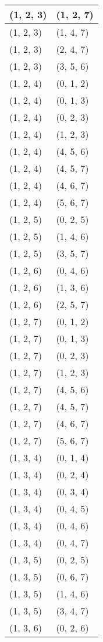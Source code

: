 \begin{footnotesize}
\begin{longtable}[c]{|l|l|}
(1, 2, 3)
&(1, 2, 7)
\\ \hline
(1, 2, 3)
&(1, 4, 7)
\\ \hline
(1, 2, 3)
&(2, 4, 7)
\\ \hline
(1, 2, 3)
&(3, 5, 6)
\\ \hline
(1, 2, 4)
&(0, 1, 2)
\\ \hline
(1, 2, 4)
&(0, 1, 3)
\\ \hline
(1, 2, 4)
&(0, 2, 3)
\\ \hline
(1, 2, 4)
&(1, 2, 3)
\\ \hline
(1, 2, 4)
&(4, 5, 6)
\\ \hline
(1, 2, 4)
&(4, 5, 7)
\\ \hline
(1, 2, 4)
&(4, 6, 7)
\\ \hline
(1, 2, 4)
&(5, 6, 7)
\\ \hline
(1, 2, 5)
&(0, 2, 5)
\\ \hline
(1, 2, 5)
&(1, 4, 6)
\\ \hline
(1, 2, 5)
&(3, 5, 7)
\\ \hline
(1, 2, 6)
&(0, 4, 6)
\\ \hline
(1, 2, 6)
&(1, 3, 6)
\\ \hline
(1, 2, 6)
&(2, 5, 7)
\\ \hline
(1, 2, 7)
&(0, 1, 2)
\\ \hline
(1, 2, 7)
&(0, 1, 3)
\\ \hline
(1, 2, 7)
&(0, 2, 3)
\\ \hline
(1, 2, 7)
&(1, 2, 3)
\\ \hline
(1, 2, 7)
&(4, 5, 6)
\\ \hline
(1, 2, 7)
&(4, 5, 7)
\\ \hline
(1, 2, 7)
&(4, 6, 7)
\\ \hline
(1, 2, 7)
&(5, 6, 7)
\\ \hline
(1, 3, 4)
&(0, 1, 4)
\\ \hline
(1, 3, 4)
&(0, 2, 4)
\\ \hline
(1, 3, 4)
&(0, 3, 4)
\\ \hline
(1, 3, 4)
&(0, 4, 5)
\\ \hline
(1, 3, 4)
&(0, 4, 6)
\\ \hline
(1, 3, 4)
&(0, 4, 7)
\\ \hline
(1, 3, 5)
&(0, 2, 5)
\\ \hline
(1, 3, 5)
&(0, 6, 7)
\\ \hline
(1, 3, 5)
&(1, 4, 6)
\\ \hline
(1, 3, 5)
&(3, 4, 7)
\\ \hline
(1, 3, 6)
&(0, 2, 6)
\\ \hline

\end{longtable}
\end{footnotesize}
